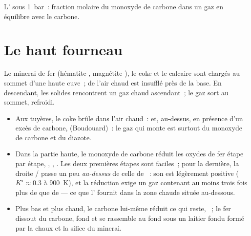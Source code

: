 \begin{omfigure}

{\small L' sous \qty{1}{bar}~: fraction molaire du monoxyde
de carbone dans un gaz en équilibre avec le carbone.}
\end{omfigure}

\section{Le haut fourneau}

Le minerai de fer (hématite , magnétite ), le coke et le calcaire sont
chargés au sommet d'une haute cuve~; de l'air chaud est insufflé
près de la base. En descendant, les solides rencontrent un gaz chaud ascendant~; le gaz sort
au sommet, refroidi.
\begin{itemize}
  \item Aux tuyères, le coke brûle dans l'air chaud~:  et,
        au-dessus, en présence d'un excès de carbone,  (Boudouard)~: le gaz
        qui monte est surtout du monoxyde de carbone et du diazote.
  \item Dans la partie haute, le monoxyde de carbone réduit les oxydes de fer étape par
        étape, , ,
        . Les deux premières étapes sont faciles~; pour la dernière,
        la droite / passe un peu \textit{au-dessus} de celle de
        ~: son  est légèrement positive
        ($K^\circ \approx 0.3$ à \qty{900}{K}), et la réduction exige un gaz
        contenant au moins trois fois plus de  que de  --- ce que
        l' fournit dans la zone chaude située au-dessous.
  \item Plus bas et plus chaud, le carbone lui-même réduit ce qui reste, ~; le fer dissout du carbone, fond et se rassemble au fond
        sous un laitier fondu formé par la chaux et la silice du minerai.
\end{itemize}

